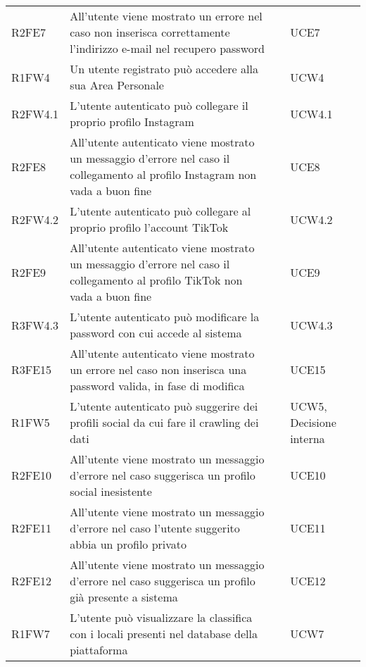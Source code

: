 \begin{longtable}{ m{}<{\centering}  m{}<{\centering}  m{}<{\centering}  m{}<{\centering}}
	R2FE7 & All’utente viene mostrato un errore nel caso non inserisca correttamente l’indirizzo e-mail nel recupero password & \De & UCE7\\	

	R1FW4 &	Un utente registrato può accedere alla sua Area Personale & \Ob & UCW4 \\ 
	 
	R2FW4.1 & L’utente autenticato può collegare il proprio profilo Instagram  & \De & UCW4.1\\	
	 
	R2FE8 & All’utente autenticato viene mostrato un messaggio d’errore nel caso il collegamento al profilo Instagram non vada a buon fine & \De & UCE8\\	
	 
	R2FW4.2 & L’utente autenticato può collegare al proprio profilo l’account TikTok & \De & UCW4.2\\		 

	R2FE9 & All’utente autenticato viene mostrato un messaggio d’errore nel caso il collegamento al profilo TikTok non vada a buon fine  & \De & UCE9 \\		
	 
	R3FW4.3 & L’utente autenticato può modificare la password con cui accede al sistema & \Fa & UCW4.3\\				
	 
	R3FE15 & All’utente autenticato viene mostrato un errore nel caso non inserisca una password valida, in fase di modifica  & \Fa & UCE15\\			
	  	 	 	
	R1FW5 & L’utente autenticato può suggerire dei profili social da cui fare il crawling dei dati & \Ob & UCW5, Decisione interna\\		
	 
	R2FE10 & All’utente viene mostrato un messaggio d’errore nel caso suggerisca un profilo social inesistente & \De & UCE10\\		

	R2FE11 & All’utente viene mostrato un messaggio d’errore nel caso l’utente suggerito abbia un profilo privato & \De & UCE11\\
	 
	R2FE12 & All’utente viene mostrato un messaggio d’errore nel caso suggerisca un profilo già presente a sistema & \De & UCE12\\			
	 
	R1FW7 & L’utente può visualizzare la classifica con i locali presenti nel database della piattaforma & \Ob & UCW7\\	
	 

\end{longtable}
